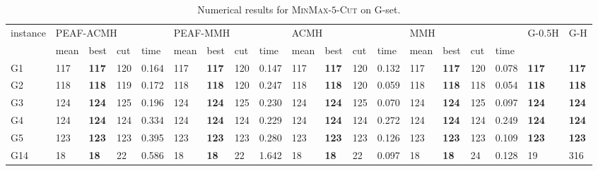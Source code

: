 \documentclass[12pt, a4paper]{article}%
\renewcommand{\arraystretch}{1.3}
\numberwithin{equation}{section}
\theoremstyle{plain}
\begin{document}
			
			
			{
				\scriptsize
				\setlength{\tabcolsep}{6.5pt}
				\renewcommand{\arraystretch}{1.2}
				\begin{landscape}
					\begin{longtable}{lllllllllllllllllll}
						\caption[Results for \textsc{MinMax}-$5$-\textsc{Cut}]{Numerical results for \textsc{MinMax}-$5$-\textsc{Cut} on G-set.}
						\label{tab::min-max5cut}\\
						\hline
						\multirow{2}{*}{instance} & \multicolumn{4}{l}{PEAF-ACMH}               & \multicolumn{4}{l}{PEAF-MMH}                & \multicolumn{4}{l}{ACMH}                   & \multicolumn{4}{l}{MMH}                    & \multirow{2}{*}{G-0.5H} & \multirow{2}{*}{G-H} \\ \cline{2-17}
						& mean    & best           & cut   & time      & mean    & best           & cut   & time     & mean    & best           & cut   & time      & mean    & best           & cut   & time     &                         &                      \\ \hline
						G1                        & 117  & \textbf{117} & 120 & 0.164   & 117     & \textbf{117} & 120   & 0.147   & 117  & \textbf{117} & 120 & 0.132   & 117    & \textbf{117} & 120   & 0.078   & \textbf{117}            & \textbf{117}         \\
						G2                        & 118  & \textbf{118} & 119 & 0.172   & 118     & \textbf{118} & 120   & 0.247   & 118  & \textbf{118} & 120 & 0.059   & 118    & \textbf{118} & 118   & 0.054   & \textbf{118}            & \textbf{118}         \\
						G3                        & 124  & \textbf{124} & 125 & 0.196   & 124     & \textbf{124} & 125   & 0.230   & 124  & \textbf{124} & 125 & 0.070   & 124    & \textbf{124} & 125   & 0.097   & \textbf{124}            & \textbf{124}         \\
						G4                        & 124  & \textbf{124} & 124 & 0.334   & 124     & \textbf{124} & 124   & 0.229   & 124  & \textbf{124} & 124 & 0.272   & 124    & \textbf{124} & 124   & 0.249   & \textbf{124}            & \textbf{124}         \\
						G5                        & 123  & \textbf{123} & 123 & 0.395   & 123     & \textbf{123} & 123   & 0.280   & 123  & \textbf{123} & 123 & 0.126   & 123    & \textbf{123} & 123   & 0.109   & \textbf{123}            & \textbf{123}         \\
						G14                       & 18   & \textbf{18}  & 22  & 0.586   & 18      & \textbf{18}  & 22    & 1.642   & 18   & \textbf{18}  & 22  & 0.097   & 18     & \textbf{18}  & 24    & 0.128   & 19                      & 316                  \\

\end{longtable}
\end{landscape}}
\end{document}
